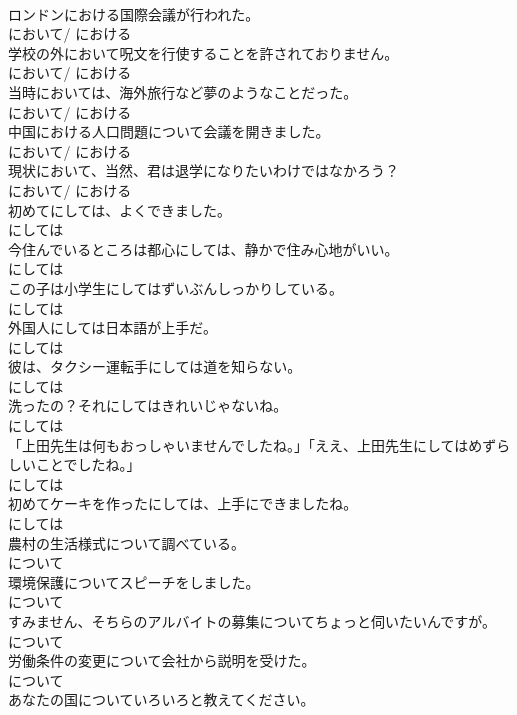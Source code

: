\documentclass[8pt]{extreport}
\begin{document}
\begin{CJK}{UTF8}{min}
\\	ロンドンにおける国際会議が行われた。	
\\	において/ における
\\	学校の外において呪文を行使することを許されておりません。	
\\	において/ における
\\	当時においては、海外旅行など夢のようなことだった。	
\\	において/ における
\\	中国における人口問題について会議を開きました。	
\\	において/ における
\\	現状において、当然、君は退学になりたいわけではなかろう？	
\\	において/ における
\\	初めてにしては、よくできました。	
\\	にしては
\\	今住んでいるところは都心にしては、静かで住み心地がいい。	
\\	にしては
\\	この子は小学生にしてはずいぶんしっかりしている。	
\\	にしては
\\	外国人にしては日本語が上手だ。	
\\	にしては
\\	彼は、タクシー運転手にしては道を知らない。	
\\	にしては
\\	洗ったの？それにしてはきれいじゃないね。	
\\	にしては
\\	「上田先生は何もおっしゃいませんでしたね。」「ええ、上田先生にしてはめずらしいことでしたね。」	
\\	にしては
\\	初めてケーキを作ったにしては、上手にできましたね。	
\\	にしては
\\	農村の生活様式について調べている。	
\\	について
\\	環境保護についてスピーチをしました。	
\\	について
\\	すみません、そちらのアルバイトの募集についてちょっと伺いたいんですが。	
\\	について
\\	労働条件の変更について会社から説明を受けた。	
\\	について
\\	あなたの国についていろいろと教えてください。	

\end{CJK}
\end{document}
